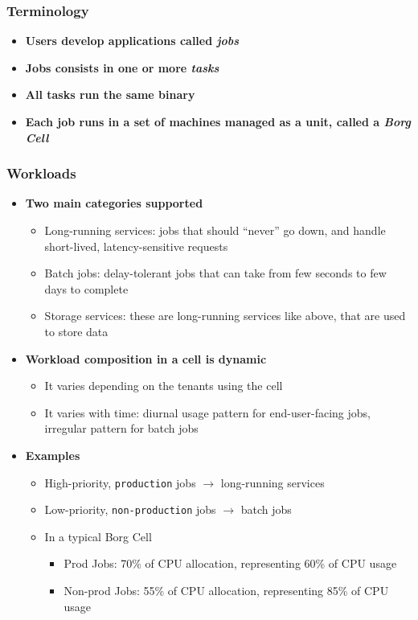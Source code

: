 \begin{frame}
\frametitle{Terminology}
\begin{itemize}
	\item {\bf Users develop applications called {\it jobs}}
	
\vspace{20pt}

	\item {\bf Jobs consists in one or more {\it tasks}}

\vspace{20pt}

	\item {\bf All tasks run the same binary}

\vspace{20pt}

	\item {\bf Each job runs in a set of machines managed as a unit, called a {\it Borg Cell}}
\end{itemize}
\end{frame}

\begin{frame}
\frametitle{Workloads}
\begin{itemize}
	\item {\bf Two main categories supported}
	\begin{itemize}
		\item Long-running services: jobs that should ``never'' go down, and handle short-lived, latency-sensitive requests
		\item Batch jobs: delay-tolerant jobs that can take from few seconds to few days to complete
		\item Storage services: these are long-running services like above, that are used to store data
	\end{itemize}
	\item {\bf Workload composition in a cell is dynamic}
	\begin{itemize}
		\item It varies depending on the tenants using the cell
		\item It varies with time: diurnal usage pattern for end-user-facing jobs, irregular pattern for batch jobs
	\end{itemize}
	\item {\bf Examples}
	\begin{itemize}
		\item High-priority, \texttt{production} jobs $\to$ long-running services
		\item Low-priority, \texttt{non-production} jobs $\to$ batch jobs
		\item In a typical Borg Cell
		\begin{itemize}
			\item Prod Jobs: 70\% of CPU allocation, representing 60\% of CPU usage
			\item Non-prod Jobs: 55\% of CPU allocation, representing 85\% of CPU usage
		\end{itemize}
	\end{itemize}
\end{itemize}
\end{frame}

